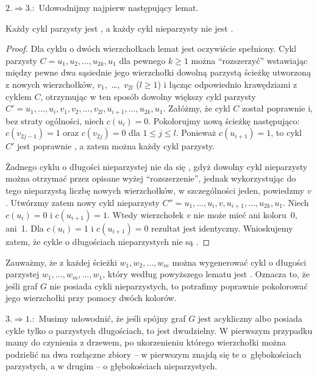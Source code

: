 $2.\Rightarrow 3.\!\!:$ Udowodnijmy najpierw następujący lemat.
\begin{lemat}
	Każdy cykl parzysty jest , a każdy cykl nieparzysty nie jest .
\end{lemat}
\begin{proof}
Dla cyklu o dwóch wierzchołkach lemat jest oczywiście spełniony. Cykl parzysty $C = u_1,u_2,\dots,u_{2k},u_1$ dla pewnego $k\ge1$ można ``rozszerzyć'' wstawiając między pewne dwa sąsiednie jego wierzchołki dowolną parzystą ścieżkę utworzoną z nowych wierzchołków, $v_1$,~\dots,~$v_{2l}$ ($l\ge1$) i łącząc odpowiednio krawędziami z cyklem $C$, otrzymując w ten sposób dowolny większy cykl parzysty $C' = u_1,\dots,u_i,v_1,v_2,\dots,v_{2l},u_{i+1},\dots,u_{2k},u_1$. Załóżmy, że cykl $C$ został poprawnie  i, bez straty ogólności, niech $c(u_i)=0$. Pokolorujmy nową ścieżkę następująco: $c(v_{2j-1})=1$ oraz $c(v_{2j})=0$ dla $1\le j\le l$. Ponieważ $c(u_{i+1})=1$, to cykl $C'$ jest poprawnie , a zatem można  każdy cykl parzysty.

Żadnego cyklu o długości nieparzystej nie da się , gdyż dowolny cykl nieparzysty można otrzymać przez opisane wyżej ``rozszerzenie'', jednak wykorzystując do tego nieparzystą liczbę nowych wierzchołków, w szczególności jeden, powiedzmy $v$. Utwórzmy zatem nowy cykl nieparzysty $C''=u_1,\dots,u_i,v,u_{i+1},\dots,u_{2k},u_1$. Niech $c(u_i)=0$ i $c(u_{i+1})=1$. Wtedy wierzchołek $v$ nie może mieć ani koloru~0, ani~1. Dla $c(u_i)=1$ i $c(u_{i+1})=0$ rezultat jest identyczny. Wnioskujemy zatem, że cykle o długościach nieparzystych nie są .
\end{proof}

Zauważmy, że z każdej ścieżki $w_1,w_2,\dots,w_m$ można wygenerować cykl o długości parzystej $w_1,\dots,w_m,\dots,w_1$, który według powyższego lematu jest . Oznacza to, że jeśli graf $G$ nie posiada cykli nieparzystych, to potrafimy poprawnie pokolorować jego wierzchołki przy pomocy dwóch kolorów.
\bigskip

$3.\Rightarrow 1.\!\!:$ Musimy udowodnić, że jeśli spójny graf $G$ jest acykliczny albo posiada cykle tylko o parzystych długościach, to jest dwudzielny. W pierwszym przypadku mamy do czynienia z drzewem, po ukorzenieniu którego wierzchołki można podzielić na dwa rozłączne zbiory -- w pierwszym znajdą się te o~głębokościach parzystych, a w drugim -- o głębokościach nieparzystych.

